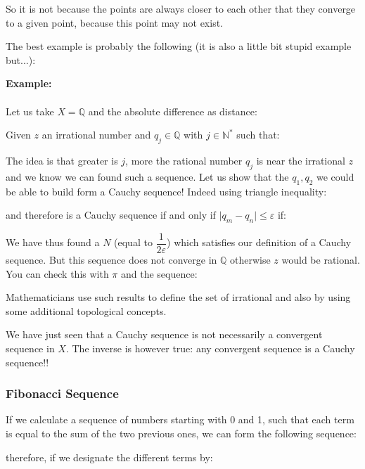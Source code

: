 	So it is not because the points are always closer to each other that they converge to a given point, because this point may not exist.
	
	The best example is probably the following (it is also a little bit stupid example but...):
	\begin{tcolorbox}[colframe=black,colback=white,sharp corners]
\textbf{{\Large {}}Example:}\\\\
Let us take $X=\mathbb{Q}$ and the absolute difference as distance:
	
	Given $z$ an irrational number and $q_j \in \mathbb{Q}$ with $j \in \mathbb{N}^{*}$ such that:
	
	The idea is that greater is $j$, more the rational number $q_j$ is near the irrational $z$ and we know we can found such a sequence.
	Let us show that the $q_1,q_2$ we could be able to build form a Cauchy sequence! Indeed using triangle inequality:
	
	and therefore is a Cauchy sequence if and only if $\vert q_m-q_n \vert\leq \varepsilon$ if:
	
	We have thus found a $N$ (equal to $\dfrac{1}{2\varepsilon}$) which satisfies our definition of a Cauchy sequence. But this sequence does not converge in $\mathbb{Q}$ otherwise $z$ would be rational.
	You can check this with $\pi$ and the sequence:
	
	\end{tcolorbox}
	
	\begin{tcolorbox}[title=Remark,colframe=black,arc=10pt]
Mathematicians use such results to define the set of irrational and also by using some additional topological concepts.
	\end{tcolorbox}
	We have just seen that a Cauchy sequence is not necessarily a convergent sequence in $X$. The inverse is however true: any convergent sequence is a Cauchy sequence!!
	
	\subsubsection{Fibonacci Sequence}\label{Fibonacci Sequence}
	
	If we calculate a sequence of numbers starting with 0 and 1, such that each term is equal to the sum of the two previous ones, we can form the following sequence:
	
	therefore, if we designate the different terms by:
	
